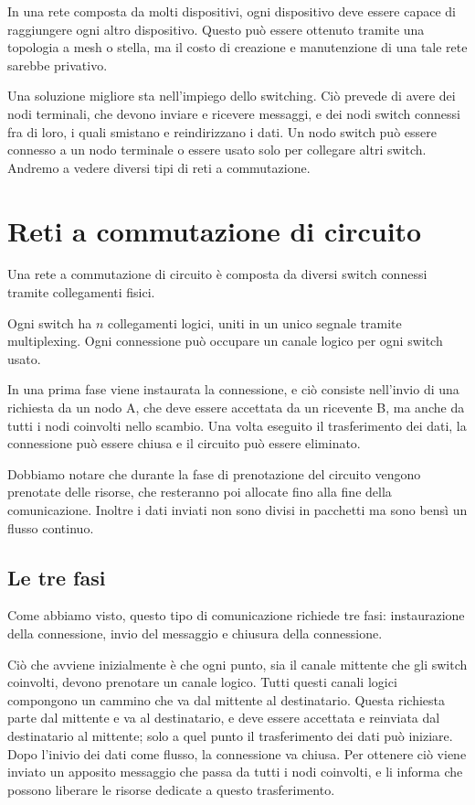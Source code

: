 In una rete composta da molti dispositivi, ogni dispositivo deve essere capace di raggiungere ogni altro dispositivo. Questo può essere ottenuto tramite una topologia a mesh o stella, ma il costo di creazione e manutenzione di una tale rete sarebbe privativo.

Una soluzione migliore sta nell'impiego dello switching. Ciò prevede di avere dei nodi terminali, che devono inviare e ricevere messaggi, e dei nodi switch connessi fra di loro, i quali smistano e reindirizzano i dati. Un nodo switch può essere connesso a un nodo terminale o essere usato solo per collegare altri switch. Andremo a vedere diversi tipi di reti a commutazione.

\section{Reti a commutazione di circuito}
    Una rete a commutazione di circuito è composta da diversi switch connessi tramite collegamenti fisici.
    
    Ogni switch ha $n$ collegamenti logici, uniti in un unico segnale tramite multiplexing. Ogni connessione può occupare un canale logico per ogni switch usato.
    
    In una prima fase viene instaurata la connessione, e ciò consiste nell'invio di una richiesta da un nodo A, che deve essere accettata da un ricevente B, ma anche da tutti i nodi coinvolti nello scambio. Una volta eseguito il trasferimento dei dati, la connessione può essere chiusa e il circuito può essere eliminato.
    
    Dobbiamo notare che durante la fase di prenotazione del circuito vengono prenotate delle risorse, che resteranno poi allocate fino alla fine della comunicazione. Inoltre i dati inviati non sono divisi in pacchetti ma sono bensì un flusso continuo.
    
    \subsection{Le tre fasi}
        Come abbiamo visto, questo tipo di comunicazione richiede tre fasi: instaurazione della connessione, invio del messaggio e chiusura della connessione.
        
        Ciò che avviene inizialmente è che ogni punto, sia il canale mittente che gli switch coinvolti, devono prenotare un canale logico. Tutti questi canali logici compongono un cammino che va dal mittente al destinatario. Questa richiesta parte dal mittente e va al destinatario, e deve essere accettata e reinviata dal destinatario al mittente; solo a quel punto il trasferimento dei dati può iniziare. Dopo l'inivio dei dati come flusso, la connessione va chiusa. Per ottenere ciò viene inviato un apposito messaggio che passa da tutti i nodi coinvolti, e li informa che possono liberare le risorse dedicate a questo trasferimento.
        
